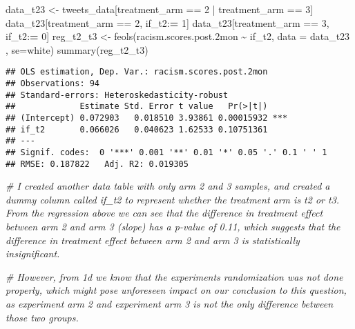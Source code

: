 \documentclass[
]{article}
\newenvironment{Shaded}{\begin{snugshade}}{\end{snugshade}}
\newcommand{\AttributeTok}[1]{\textcolor[rgb]{0.77,0.63,0.00}{#1}}
\newcommand{\CommentTok}[1]{\textcolor[rgb]{0.56,0.35,0.01}{\textit{#1}}}
\newcommand{\DecValTok}[1]{\textcolor[rgb]{0.00,0.00,0.81}{#1}}
\newcommand{\ErrorTok}[1]{\textcolor[rgb]{0.64,0.00,0.00}{\textbf{#1}}}
\newcommand{\FloatTok}[1]{\textcolor[rgb]{0.00,0.00,0.81}{#1}}
\newcommand{\FunctionTok}[1]{\textcolor[rgb]{0.00,0.00,0.00}{#1}}
\newcommand{\NormalTok}[1]{#1}
\newcommand{\OtherTok}[1]{\textcolor[rgb]{0.56,0.35,0.01}{#1}}
\newcommand{\SpecialCharTok}[1]{\textcolor[rgb]{0.00,0.00,0.00}{#1}}
\newcommand{\StringTok}[1]{\textcolor[rgb]{0.31,0.60,0.02}{#1}}
\begin{document}
\begin{Shaded}
\begin{Highlighting}[]
\NormalTok{data\_t23 }\OtherTok{\textless{}{-}}\NormalTok{ tweets\_data[treatment\_arm }\SpecialCharTok{==} \DecValTok{2} \SpecialCharTok{|}\NormalTok{ treatment\_arm }\SpecialCharTok{==} \DecValTok{3}\NormalTok{]}
\NormalTok{data\_t23[treatment\_arm }\SpecialCharTok{==} \DecValTok{2}\NormalTok{, if\_t2}\SpecialCharTok{:}\ErrorTok{=} \DecValTok{1}\NormalTok{]}
\NormalTok{data\_t23[treatment\_arm }\SpecialCharTok{==} \DecValTok{3}\NormalTok{, if\_t2}\SpecialCharTok{:}\ErrorTok{=} \DecValTok{0}\NormalTok{]}
\NormalTok{reg\_t2\_t3 }\OtherTok{\textless{}{-}} \FunctionTok{feols}\NormalTok{(racism.scores.post}\FloatTok{.2}\NormalTok{mon }\SpecialCharTok{\textasciitilde{}}\NormalTok{ if\_t2, }\AttributeTok{data =}\NormalTok{ data\_t23 , }\AttributeTok{se=}\StringTok{\textquotesingle{}white\textquotesingle{}}\NormalTok{)}
\FunctionTok{summary}\NormalTok{(reg\_t2\_t3)}
\end{Highlighting}
\end{Shaded}

\begin{verbatim}
## OLS estimation, Dep. Var.: racism.scores.post.2mon
## Observations: 94 
## Standard-errors: Heteroskedasticity-robust 
##             Estimate Std. Error t value   Pr(>|t|)    
## (Intercept) 0.072903   0.018510 3.93861 0.00015932 ***
## if_t2       0.066026   0.040623 1.62533 0.10751361    
## ---
## Signif. codes:  0 '***' 0.001 '**' 0.01 '*' 0.05 '.' 0.1 ' ' 1
## RMSE: 0.187822   Adj. R2: 0.019305
\end{verbatim}

\begin{Shaded}
\begin{Highlighting}[]
\CommentTok{\# I created another data table with only arm 2 and 3 samples, and created a dummy column called if\_t2 to represent whether the treatment arm is t2 or t3. From the regression above we can see that the difference in treatment effect between arm 2 and arm 3 (slope) has a p{-}value of 0.11, which suggests that the difference in treatment effect between arm 2 and arm 3 is statistically insignificant.}

\CommentTok{\# However, from 1d we know that the experiment\textquotesingle{}s randomization was not done properly, which might pose unforeseen impact on our conclusion to this question, as experiment arm 2 and experiment arm 3 is not the only difference between those two groups.}
\end{Highlighting}
\end{Shaded}
\end{document}
